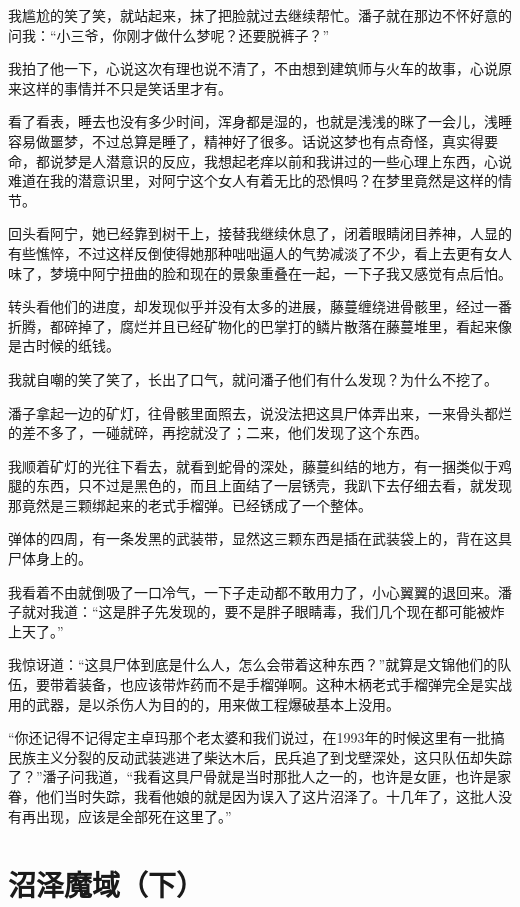 我尴尬的笑了笑，就站起来，抹了把脸就过去继续帮忙。潘子就在那边不怀好意的问我：“小三爷，你刚才做什么梦呢？还要脱裤子？”

我拍了他一下，心说这次有理也说不清了，不由想到建筑师与火车的故事，心说原来这样的事情并不只是笑话里才有。

看了看表，睡去也没有多少时间，浑身都是湿的，也就是浅浅的眯了一会儿，浅睡容易做噩梦，不过总算是睡了，精神好了很多。话说这梦也有点奇怪，真实得要命，都说梦是人潜意识的反应，我想起老痒以前和我讲过的一些心理上东西，心说难道在我的潜意识里，对阿宁这个女人有着无比的恐惧吗？在梦里竟然是这样的情节。

回头看阿宁，她已经靠到树干上，接替我继续休息了，闭着眼睛闭目养神，人显的有些憔悴，不过这样反倒使得她那种咄咄逼人的气势减淡了不少，看上去更有女人味了，梦境中阿宁扭曲的脸和现在的景象重叠在一起，一下子我又感觉有点后怕。

转头看他们的进度，却发现似乎并没有太多的进展，藤蔓缠绕进骨骸里，经过一番折腾，都碎掉了，腐烂并且已经矿物化的巴掌打的鳞片散落在藤蔓堆里，看起来像是古时候的纸钱。

我就自嘲的笑了笑了，长出了口气，就问潘子他们有什么发现？为什么不挖了。

潘子拿起一边的矿灯，往骨骸里面照去，说没法把这具尸体弄出来，一来骨头都烂的差不多了，一碰就碎，再挖就没了；二来，他们发现了这个东西。

我顺着矿灯的光往下看去，就看到蛇骨的深处，藤蔓纠结的地方，有一捆类似于鸡腿的东西，只不过是黑色的，而且上面结了一层锈壳，我趴下去仔细去看，就发现那竟然是三颗绑起来的老式手榴弹。已经锈成了一个整体。

弹体的四周，有一条发黑的武装带，显然这三颗东西是插在武装袋上的，背在这具尸体身上的。

我看着不由就倒吸了一口冷气，一下子走动都不敢用力了，小心翼翼的退回来。潘子就对我道：“这是胖子先发现的，要不是胖子眼睛毒，我们几个现在都可能被炸上天了。”

我惊讶道：“这具尸体到底是什么人，怎么会带着这种东西？”就算是文锦他们的队伍，要带着装备，也应该带炸药而不是手榴弹啊。这种木柄老式手榴弹完全是实战用的武器，是以杀伤人为目的的，用来做工程爆破基本上没用。

“你还记得不记得定主卓玛那个老太婆和我们说过，在1993年的时候这里有一批搞民族主义分裂的反动武装逃进了柴达木后，民兵追了到戈壁深处，这只队伍却失踪了？”潘子问我道，“我看这具尸骨就是当时那批人之一的，也许是女匪，也许是家眷，他们当时失踪，我看他娘的就是因为误入了这片沼泽了。十几年了，这批人没有再出现，应该是全部死在这里了。”

\chapter{沼泽魔域（下）}

